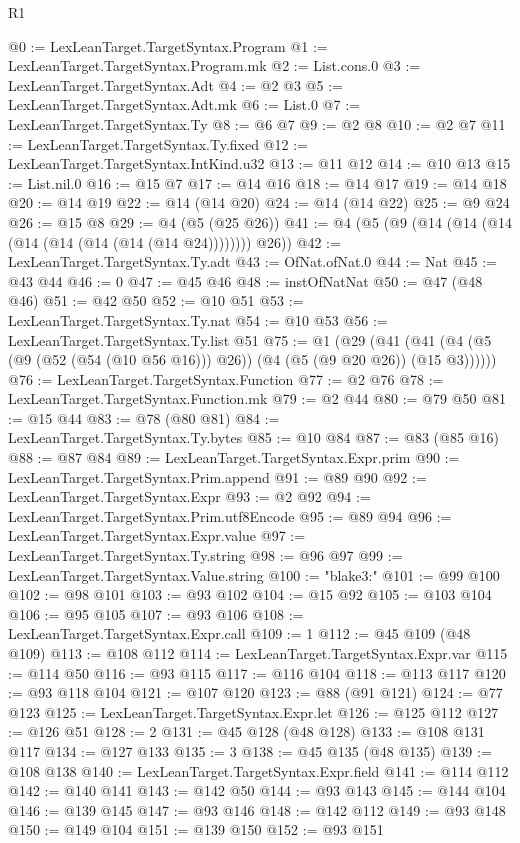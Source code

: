 \begin{lexlean}{R1}
\begin{coremodule}
@0 := LexLeanTarget.TargetSyntax.Program
@1 := LexLeanTarget.TargetSyntax.Program.mk
@2 := List.cons.{0}
@3 := LexLeanTarget.TargetSyntax.Adt
@4 := @2 @3
@5 := LexLeanTarget.TargetSyntax.Adt.mk
@6 := List.{0}
@7 := LexLeanTarget.TargetSyntax.Ty
@8 := @6 @7
@9 := @2 @8
@10 := @2 @7
@11 := LexLeanTarget.TargetSyntax.Ty.fixed
@12 := LexLeanTarget.TargetSyntax.IntKind.u32
@13 := @11 @12
@14 := @10 @13
@15 := List.nil.{0}
@16 := @15 @7
@17 := @14 @16
@18 := @14 @17
@19 := @14 @18
@20 := @14 @19
@22 := @14 (@14 @20)
@24 := @14 (@14 @22)
@25 := @9 @24
@26 := @15 @8
@29 := @4 (@5 (@25 @26))
@41 := @4 (@5 (@9 (@14 (@14 (@14 (@14 (@14 (@14 (@14 (@14 @24)))))))) @26))
@42 := LexLeanTarget.TargetSyntax.Ty.adt
@43 := OfNat.ofNat.{0}
@44 := Nat
@45 := @43 @44
@46 := 0
@47 := @45 @46
@48 := instOfNatNat
@50 := @47 (@48 @46)
@51 := @42 @50
@52 := @10 @51
@53 := LexLeanTarget.TargetSyntax.Ty.nat
@54 := @10 @53
@56 := LexLeanTarget.TargetSyntax.Ty.list @51
@75 := @1
    (@29 (@41 (@41 (@4 (@5 (@9 (@52 (@54 (@10 @56 @16))) @26)) (@4 (@5 (@9 @20 @26)) (@15 @3))))))
@76 := LexLeanTarget.TargetSyntax.Function
@77 := @2 @76
@78 := LexLeanTarget.TargetSyntax.Function.mk
@79 := @2 @44
@80 := @79 @50
@81 := @15 @44
@83 := @78 (@80 @81)
@84 := LexLeanTarget.TargetSyntax.Ty.bytes
@85 := @10 @84
@87 := @83 (@85 @16)
@88 := @87 @84
@89 := LexLeanTarget.TargetSyntax.Expr.prim
@90 := LexLeanTarget.TargetSyntax.Prim.append
@91 := @89 @90
@92 := LexLeanTarget.TargetSyntax.Expr
@93 := @2 @92
@94 := LexLeanTarget.TargetSyntax.Prim.utf8Encode
@95 := @89 @94
@96 := LexLeanTarget.TargetSyntax.Expr.value
@97 := LexLeanTarget.TargetSyntax.Ty.string
@98 := @96 @97
@99 := LexLeanTarget.TargetSyntax.Value.string
@100 := "blake3:"
@101 := @99 @100
@102 := @98 @101
@103 := @93 @102
@104 := @15 @92
@105 := @103 @104
@106 := @95 @105
@107 := @93 @106
@108 := LexLeanTarget.TargetSyntax.Expr.call
@109 := 1
@112 := @45 @109 (@48 @109)
@113 := @108 @112
@114 := LexLeanTarget.TargetSyntax.Expr.var
@115 := @114 @50
@116 := @93 @115
@117 := @116 @104
@118 := @113 @117
@120 := @93 @118 @104
@121 := @107 @120
@123 := @88 (@91 @121)
@124 := @77 @123
@125 := LexLeanTarget.TargetSyntax.Expr.let
@126 := @125 @112
@127 := @126 @51
@128 := 2
@131 := @45 @128 (@48 @128)
@133 := @108 @131 @117
@134 := @127 @133
@135 := 3
@138 := @45 @135 (@48 @135)
@139 := @108 @138
@140 := LexLeanTarget.TargetSyntax.Expr.field
@141 := @114 @112
@142 := @140 @141
@143 := @142 @50
@144 := @93 @143
@145 := @144 @104
@146 := @139 @145
@147 := @93 @146
@148 := @142 @112
@149 := @93 @148
@150 := @149 @104
@151 := @139 @150
@152 := @93 @151

\end{coremodule}
\end{lexlean}

